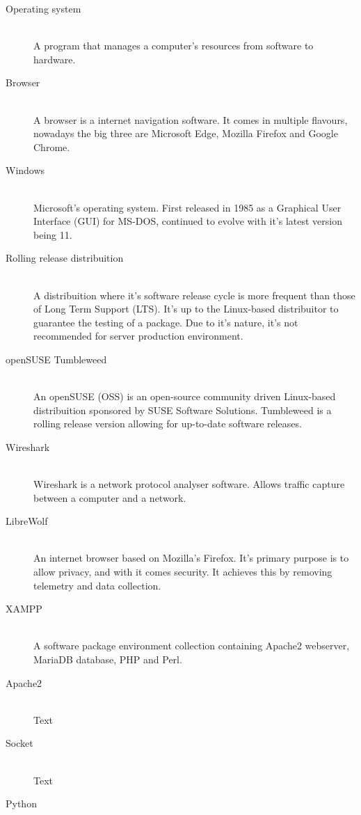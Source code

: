 \documentclass[11pt,a4paper]{report}
\begin{document}
\begin{description}
    \item[Operating system] \hfill \\
        A program that manages a computer's resources from software to hardware.
    \item[Browser] \hfill \\
        A browser is a internet navigation software. It comes in multiple flavours, nowadays the big three are Microsoft Edge, Mozilla Firefox and Google Chrome.
    \item[Windows] \hfill \\
        Microsoft's operating system. First released in 1985 as a Graphical User Interface (GUI) for MS-DOS, continued to evolve with it's latest version being 11.
    \item[Rolling release distribuition] \hfill \\
        A distribuition where it's software release cycle is more frequent than those of Long Term Support (LTS). It's up to the Linux-based distribuitor to guarantee
        the testing of a package.
        Due to it's nature, it's not recommended for server production environment.
    \item[openSUSE Tumbleweed] \hfill \\
        An openSUSE (OSS) is an open-source community driven Linux-based distribuition sponsored by SUSE Software Solutions. Tumbleweed is a rolling release version 
        allowing for up-to-date software releases.
    \item[Wireshark] \hfill \\
        Wireshark is a network protocol analyser software. Allows traffic capture between a computer and a network.
    \item[LibreWolf] \hfill \\
        An internet browser based on Mozilla's Firefox. It's primary purpose is to allow privacy, and with it comes security. It achieves this by removing telemetry and
        data collection.
    \item[XAMPP] \hfill \\
        A software package environment collection containing Apache2 webserver, MariaDB database, PHP and Perl.
    \item[Apache2] \hfill \\
        Text
    \item[Socket] \hfill \\
        Text
    \item[Python] \hfill \\

\end{description}
\end{document}
